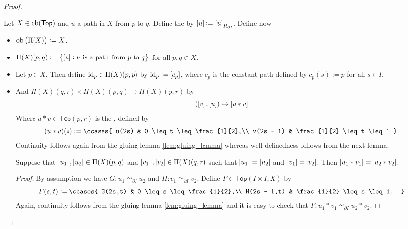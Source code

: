 \begin{proof}
\begin{enumerate}[label = \textit{Step \arabic*:},wide = 0pt, itemsep = 1.5ex]
			Let $X \in \operatorname{ob}(\mathsf{Top})$ and $u$ a path in $X$ from $p$ to $q$. Define the  by $\sbr{u} := \sbr{u}_{R_{\partial I}}$. Define now
			\begin{itemize}[leftmargin = *]
				\item $\ob\del[1]{\Pi(X)} := X$.
				\item $\Pi(X)(p,q) := \cbr{\sbr{u} : \text{$u$ is a path from $p$ to $q$}}$ for all $p,q \in X$.
				\item Let $p \in X$. Then define $\operatorname{id}_p \in \Pi(X)(p,p)$ by $\id_p := \sbr[0]{c_p}$, where $c_p$ is the constant path defined by $c_p(s) := p$ for all $s \in I$.
				\item And $\Pi(X)(q,r) \times \Pi(X)(p,q) \to \Pi(X)(p,r)$ by 
					\begin{equation*}
						(\sbr{v}, \sbr{u}) \mapsto \sbr{u \ast v}
					\end{equation*}
					Where $u \ast v \in \mathsf{Top}(p,r)$ is the , defined by
					\begin{equation*}
						(u \ast v)(s) := \ccases{
							u(2s) &    0 \leq t \leq \frac{1}{2},\\
							v(2s - 1) & \frac{1}{2} \leq t \leq 1
						}.
					\end{equation*}
					Continuity follows again from the gluing lemma \ref{lem:gluing_lemma} whereas well definedness follows from the next lemma.

					\begin{lemma}
						Suppose that $\sbr{u_1},\sbr{u_2} \in \Pi(X)(p,q)$ and $\sbr{v_1},\sbr{v_2} \in \Pi(X)(q,r)$ such that $\sbr{u_1} = \sbr{u_2}$ and $\sbr{v_1} = \sbr{v_2}$. Then $\sbr{u_1 \ast v_1} = \sbr{u_2 \ast v_2}$.
					\end{lemma}

					\begin{proof}
						By assumption we have $G : u_1 \simeq_{\partial I} u_2$ and $H : v_1 \simeq_{\partial I} v_2$. Define $F \in \mathsf{Top}(I \times I,X)$ by
						\begin{equation*}
							F(s,t) := \ccases{
								G(2s,t) & 0 \leq s \leq \frac{1}{2},\\
								H(2s - 1,t) & \frac{1}{2} \leq s \leq 1.
							}
						\end{equation*}
						Again, continuity follows from the gluing lemma \ref{lem:gluing_lemma} and it is easy to check that $F : u_1 \ast v_1 \simeq_{\partial I} u_2 \ast v_2$.
					\end{proof}
			\end{itemize}


\end{enumerate}
\end{proof}
